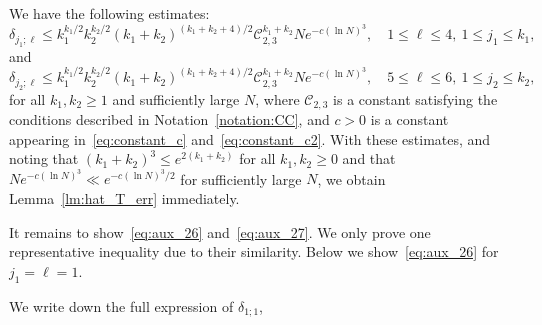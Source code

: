 \documentclass{article}
\numberwithin{equation}{section}
\newcommand{\CC}{\mathcal{C}}
\begin{document}
We have the following estimates:
\begin{equation}
	\label{eq:aux_26}
	\delta_{j_1;\ell}\le k_1^{k_1/2}k_2^{k_2/2}(k_1+k_2)^{(k_1+k_2+4)/2} \CC_{2,3}^{k_1+k_2} Ne^{-c(\ln N)^3},\quad 1\le \ell\le 4, \ 1\le j_1\le k_1,
\end{equation}
and
\begin{equation}
	\label{eq:aux_27}
	\delta_{j_2;\ell}\le k_1^{k_1/2}k_2^{k_2/2}(k_1+k_2)^{(k_1+k_2+4)/2} \CC_{2,3}^{k_1+k_2} Ne^{-c(\ln N)^3},\quad 5\le \ell\le 6, \ 1\le j_2\le k_2,
\end{equation}
for all $k_1,k_2\ge 1$ and sufficiently large $N$, where $\CC_{2,3}$ is a constant satisfying the conditions described in Notation~\ref{notation:CC}, and $c>0$ is a constant appearing in~\eqref{eq:constant_c} and~\eqref{eq:constant_c2}. With these estimates, and noting that $(k_1+k_2)^3\le e^{2(k_1+k_2)}$ for all $k_1,k_2\ge 0$ and that $Ne^{-c(\ln N)^3}\ll e^{-c(\ln N)^3/2}$ for sufficiently large $N$, we obtain Lemma~\ref{lm:hat_T_err} immediately.

It remains to show~\eqref{eq:aux_26} and~\eqref{eq:aux_27}. We only prove one representative inequality due to their similarity. Below we show~\eqref{eq:aux_26}  for $j_1=\ell =1$.

We write down the full expression of $\delta_{1;1}$,
\end{document}
